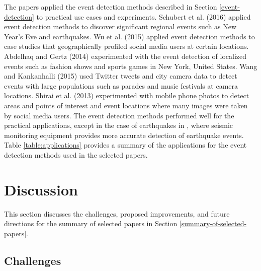 The papers applied the event detection methods described in Section \ref{event-detection} to practical use cases and experiments. Schubert et al. (2016) \cite{Schubert:2016} applied event detection methods to discover significant regional events such as New Year's Eve and earthquakes. Wu et al. (2015) \cite{Wu:2015} applied event detection methods to case studies that geographically profiled social media users at certain locations.  Abdelhaq and Gertz (2014) \cite{Abdelhaq:2014} experimented with the event detection of localized events such as fashion shows and sports games in New York, United States.  Wang and Kankanhalli (2015) \cite{Wang:2015} used Twitter tweets and city camera data to detect events with large populations such as parades and music festivals at camera locations. Shirai et al. (2013) \cite{Shirai:2013} experimented with mobile phone photos to detect areas and points of interest and event locations where many images were taken by social media users. The event detection methods performed well for the practical applications, except in the case of earthquakes in \cite{Schubert:2016}, where seismic monitoring equipment provides more accurate detection of earthquake events. Table \ref{table:applications} provides a summary of the applications for the event detection methods used in the selected papers.

\section{Discussion} \label{discussion}

This section discusses the challenges, proposed improvements, and future directions for the summary of selected papers in Section \ref{summary-of-selected-papers}.

\subsection{Challenges} \label{challenges}

